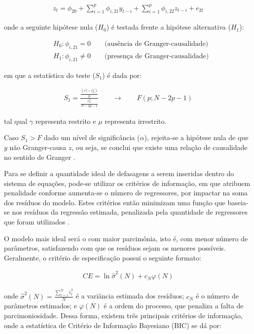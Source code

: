 \begin{ceqn}
\begin{align} \label{eq:granger_causality}
z_{t} = \phi_{20} + \sum_{i=1}^{p}{\phi_{i, 21} y_{t-i}} + \sum_{i=1}^{p}{\phi_{i, 22} z_{t-i}} + e_{2t}
\end{align}
\end{ceqn} onde a seguinte hipótese nula ($H_{0}$) é testada frente a hipótese alternativa ($H_{1}$):

\begin{ceqn}
\begin{align} \label{eq:granger_causality_hip}
&H_{0}: \phi_{i, 21} = 0 \qquad \text{(ausência de Granger-causalidade)}\\
&H_{1}: \phi_{i, 21} \neq 0 \qquad \text{(presença de Granger-causalidade)}
\end{align}
\end{ceqn} em que a estatística do teste ($S_{1}$) é dada por:

\begin{ceqn}
\begin{align} \label{eq:granger_causality_stat}
S_{1} = \frac{\frac{(e_{\gamma}^2 - e_{\mu}^2)}{p}}{\frac{e_{\mu}^2}{N - 2p - 1}} \qquad \rightarrow \qquad F(p; N - 2p - 1)
\end{align}
\end{ceqn} tal qual $\gamma$ representa restrito e $\mu$ representa irrestrito. 

Caso $S_{1} > F$ dado um nível de significância ($\alpha$), rejeita-se a hipótese nula de que $y$ não Granger-causa $z$, ou seja, se conclui que existe uma relação de causalidade no sentido de Granger \cite{bueno2008, gujarati_ecn2011}.

Para se definir a quantidade ideal de defasagens a serem inseridas dentro do sistema de equações, pode-se utilizar os critérios de informação, em que atribuem penalidade conforme aumenta-se o número de regressores, por impactar na soma dos resíduos do modelo. Estes critérios então minimizam uma função que baseia-se nos resíduos da regressão estimada, penalizada pela quantidade de regressores que foram utilizados \cite{bueno2008}.

O modelo mais ideal será o com maior parcimônia, isto é, com menor número de parâmetros, satisfazendo com que os resíduos sejam os menores possíveis. Geralmente, o critério de especificação possui o seguinte formato:

\begin{ceqn}
\begin{align} \label{eq:general_inf_crit}
CE = \ln \hat{\sigma}^2 (N) + c_{N} \varphi (N)
\end{align}
\end{ceqn} onde $\hat{\sigma}^2 (N) = \frac{\sum_{t=1}^{N}{\hat{\epsilon}_{t}^2}}{N} $ é a variância estimada dos resíduos; $c_{N}$ é o número de parâmetros estimados; e $\varphi (N)$ é a ordem do processo, que penaliza a falta de parcimoniosidade. Dessa forma, existem três principais critérios de informação, onde a estatística de Critério de Informação Bayesiano (BIC) se dá por:

